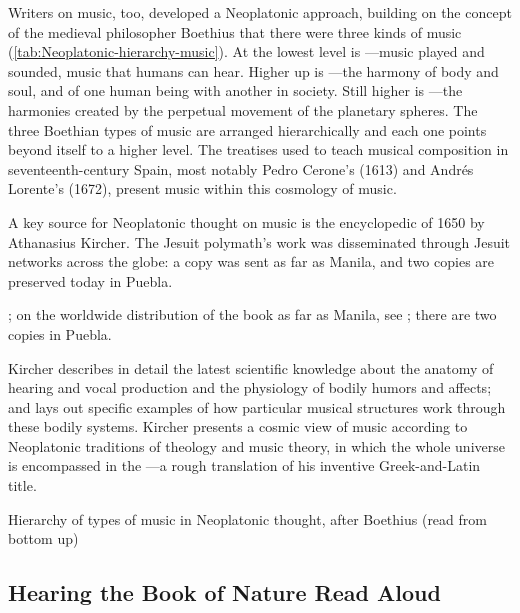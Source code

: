 Writers on music, too, developed a Neoplatonic approach, building on the
concept of the medieval philosopher Boethius that there were three kinds of
music (\cref{tab:Neoplatonic-hierarchy-music}).%
    \Autocite{Boethius:Musica}
At the lowest level is ---music played and sounded,
music that humans can hear.
Higher up is ---the harmony of body and soul, and of one
human being with another in society.
Still higher is ---the harmonies created by the perpetual
movement of the planetary spheres.
The three Boethian types of music are arranged hierarchically and each one
points beyond itself to a higher level.
The treatises used to teach musical composition in seventeenth-century Spain,
most notably Pedro Cerone's  (1613) and Andrés
Lorente's  (1672), present music within this
cosmology of music.

A key source for Neoplatonic thought on music is the encyclopedic
 of 1650 by Athanasius Kircher.%
    \Autocite{Kircher:Musurgia}
The Jesuit polymath's work was disseminated through Jesuit networks across the
globe: a copy was sent as far as Manila, and two copies are preserved today in
Puebla.%
\begin{Footnote}
    \Autocites
    {Findlen:Kircher}
    {Godwin:KircherTheater};
    on the worldwide distribution of the book as far as Manila, see
    \autocite[48--50]{Irving:Colonial}; there are two copies in Puebla.
\end{Footnote}
Kircher describes in detail the latest scientific knowledge about the anatomy
of hearing and vocal production and the physiology of bodily humors and
affects; and lays out specific examples of how particular musical structures
work through these bodily systems.
Kircher presents a cosmic view of music according to Neoplatonic traditions of
theology and music theory, in which the whole universe is encompassed in the
---a rough translation of his inventive
Greek-and-Latin title.

{Hierarchy of types of music in Neoplatonic thought, after Boethius (read from
bottom up)}

\subsection{Hearing the Book of Nature Read Aloud}

